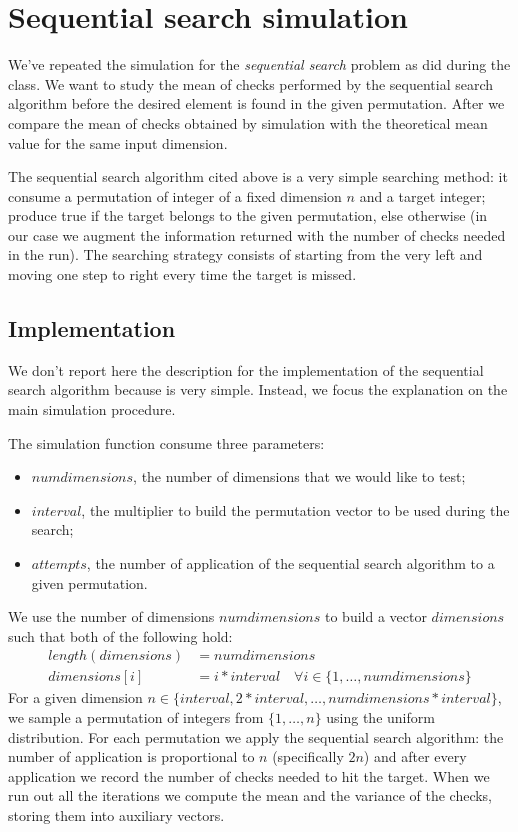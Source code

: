 \chapter{Sequential search simulation}

We've repeated the simulation for the \emph{sequential search} problem
as did during the class. We want to study the mean of checks performed
by the sequential search algorithm before the desired element is
found in the given permutation. After we compare the mean of checks
obtained by simulation with the theoretical mean value for the same
input dimension.

The sequential search algorithm cited above is a very simple searching
method: it consume a permutation of integer of a fixed dimension $n$
and a target integer; produce true if the target belongs to the given
permutation, else otherwise (in our case we augment the information
returned with the number of checks needed in the run). The searching
strategy consists of starting from the very left and moving one step
to right every time the target is missed.

\section{Implementation}

We don't report here the description for the implementation of the
sequential search algorithm because is very simple. Instead, we focus
the explanation on the main simulation procedure.

The simulation function consume three parameters:
\begin{itemize}
\item $numdimensions$, the number of dimensions that we would like to
  test;
\item $interval$, the multiplier to build the permutation vector to be
  used during the search;
\item $attempts$, the number of application of the sequential search
  algorithm to a given permutation.
\end{itemize}
We use the number of dimensions $numdimensions$ to build a vector
$dimensions$ such that both of the following hold:
\begin{displaymath}
  \begin{split}
    length(dimensions)&=numdimensions \\
    dimensions[i]&=i * interval \quad \forall i \in \{1,\ldots,numdimensions\}
  \end{split}
\end{displaymath}
For a given dimension $n \in \{interval, 2*interval,
\ldots,numdimensions*interval\}$, we sample a permutation of integers
from $\{1,\ldots,n\}$ using the uniform distribution. For each
permutation we apply the sequential search algorithm: the number of
application is proportional to $n$ (specifically $2n$) and after every
application we record the number of checks needed to hit the target.
When we run out all the iterations we compute the mean and the
variance of the checks, storing them into auxiliary vectors.

